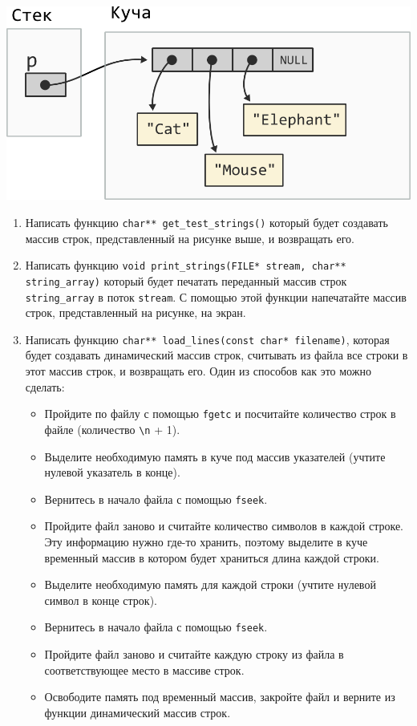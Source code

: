 \documentclass{article}
\begin{document}
\begin{center}
\includegraphics[scale=0.8]{../images/malloc_homework/12string_array_heap.png}
\end{center}

\begin{enumerate}
\item Написать функцию \texttt{char** get\_test\_strings()} который будет создавать массив строк, представленный на рисунке выше, и возвращать его.

\item Написать функцию \texttt{void print\_strings(FILE* stream, char** string\_array)} который будет печатать переданный массив строк \texttt{string\_array} в поток \texttt{stream}. С помощью этой функции напечатайте массив строк, представленный на рисунке, на экран.

\item Написать функцию \texttt{char** load\_lines(const char* filename)},
которая будет создавать динамический массив строк, считывать из файла все строки в этот массив строк, и возвращать его. Один из способов как это можно сделать:
\begin{itemize}
\item Пройдите по файлу с помощью \texttt{fgetc} и посчитайте количество строк в файле (количество \texttt{\textbackslash n} + 1).
\item Выделите необходимую память в куче под массив указателей (учтите нулевой указатель в конце).
\item Вернитесь в начало файла с помощью \texttt{fseek}.
\item Пройдите файл заново и считайте количество символов в каждой строке. Эту информацию нужно где-то хранить, поэтому выделите в куче временный массив в котором будет храниться длина каждой строки.
\item Выделите необходимую память для каждой строки (учтите нулевой символ в конце строк).
\item Вернитесь в начало файла с помощью \texttt{fseek}.
\item Пройдите файл заново и считайте каждую строку из файла в соответствующее место в массиве строк.
\item Освободите память под временный массив, закройте файл и верните из функции динамический массив строк.
\end{itemize}


\end{enumerate}
\end{document}
